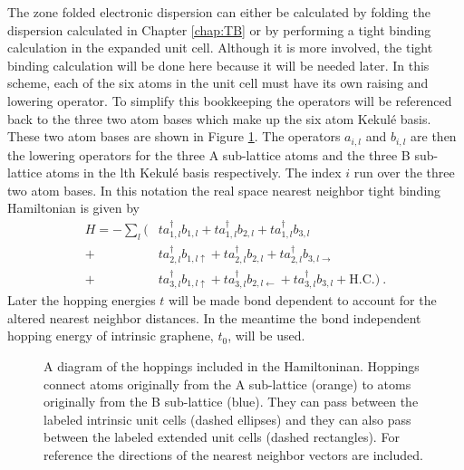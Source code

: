 The zone folded electronic dispersion can either be calculated by folding the dispersion calculated in Chapter \ref{chap:TB} or by performing a tight binding calculation in the expanded unit cell.
Although it is more involved, the tight binding calculation will be done here because it will be needed later.
In this scheme, each of the six atoms in the unit cell must have its own raising and lowering operator.
To simplify this bookkeeping the operators will be referenced back to the three two atom bases which make up the six atom Kekul\'e basis.
These two atom bases are shown in Figure \ref{fig:kek:hoppings}.
The operators $a_{i,l}$ and $b_{i,l}$ are then the lowering operators for the three A sub-lattice atoms and the three B sub-lattice atoms in the lth Kekul\'e basis respectively.
The index $i$ run over the three two atom bases.
In this notation the real space nearest neighbor tight binding Hamiltonian is given by
\newcommand{\rl}[4]{
	a^{\dagger}_{#1,#2} b_{#3,#4}
}
\begin{align}
	H=-\sum_l (
		 & t \rl{1}{l}{1}{l        }+t\rl{1}{l}{2}{l          }+t\rl{1}{l}{3}{l           } \nonumber \\
		+& t \rl{2}{l}{1}{l\uparrow}+t\rl{2}{l}{2}{l          }+t\rl{2}{l}{3}{l\rightarrow} \nonumber \\ 
		+& t \rl{3}{l}{1}{l\uparrow}+t\rl{3}{l}{2}{l\leftarrow}+t\rl{3}{l}{3}{l           } + \text{H.C.} ) \ .
		\label{eq:kek:Hreal}
\end{align}
Later the hopping energies $t$ will be made bond dependent to account for the altered nearest neighbor distances.
In the meantime the bond independent hopping energy of intrinsic graphene, $t_0$, will be used.

\begin{figure}
	\begin{center}
	
	\end{center}
	\caption[Diagram of the hoppings in the expanded Kekul\'e unit cell]{\label{fig:kek:hoppings}
		A diagram of the hoppings included in the Hamiltoninan.
		Hoppings connect atoms originally from the A sub-lattice (orange) to atoms originally from the B sub-lattice (blue).
		They can pass between the labeled intrinsic unit cells (dashed ellipses) and they can also pass between the labeled extended unit cells (dashed rectangles).
		For reference the directions of the nearest neighbor vectors are included.
	}
\end{figure}

